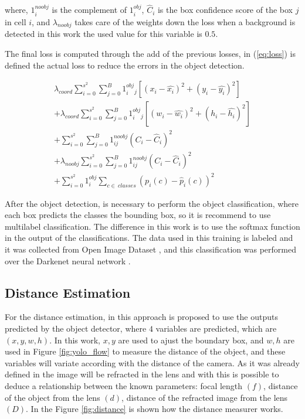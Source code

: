 where, $1^{noobj}_i$ is the complement of $1^{obj}_i$, $\hat{C}_i$ is the box confidence score of the box $j$ in cell $i$, and $\lambda_{noobj}$ takes care of the weights down the loss when a background is detected in this work the used value for this variable is $0.5$. 

The final loss is computed through the add of the previous losses, in (\ref{eq:loss}) is defined the actual loss to reduce the errors in the object detection.

\begin{equation}
\label{eq:loss}
\begin{aligned}
    \lambda_{coord}\sum_{i=0}^{s^2}\sum_{j=0}^{B}1^{obj}_i_j\left [ \left ( x_i - \hat{x_i} \right )^2  + (y_i-\hat{y_i})^2 \right ] \\ 
    + \lambda_{coord}\sum_{i=0}^{s^2}\sum_{j=0}^{B}1^{obj}_i_j\left [ \left ( w_i - \hat{w_i} \right )^2  + (h_i-\hat{h_i})^2 \right ] \\
+    \sum_{i=0}^{s^2}\sum_{j=0}^{B}1^{noobj}_{ij}\left ( C_i - \hat{C}_i \right )^2\\
+  \lambda_{noobj}\sum_{i=0}^{s^2}\sum_{j=0}^{B}1^{noobj}_{ij}\left ( C_i - \hat{C}_i \right )^2\\
+     \sum_{i=0}^{s^2}1^{obj}_i \sum_{c\in~classes} \left ( p_i\left ( c \right )-\hat{p}_i\left ( c \right )\right )^2

    \end{aligned}
\end{equation}

After the object detection, is necessary to perform the object classification, where each box predicts the classes the bounding box, so it is recommend to use multilabel classification. The difference in this work is to use the softmax function in the output of the classifications. The data used in this training is labeled and it was collected from Open Image Dataset \cite{krasin2017openimages}, and this classification was performed over the Darkenet neural network \cite{redmon2013darknet}.

\subsection{Distance Estimation}

For the distance estimation, in this approach is proposed to use the outputs predicted by the object detector, where $4$ variables are predicted, which are $(x, y, w, h)$. In this work, $x,y$ are used to ajust the boundary box, and $w, h$ are used in Figure \ref{fig:yolo_flow} to measure the distance of the object, and these variables will variate according with the distance of the camera. As it was already defined in \cite{cao2013circle} the image will be refracted in the lens and with this is possible to deduce a relationship between the known parameters: focal length $(f)$, distance of the object from the lens $(d)$, distance of the refracted image from the lens $(D)$. In the Figure \ref{fig:distance} is shown how the distance measurer works. 


